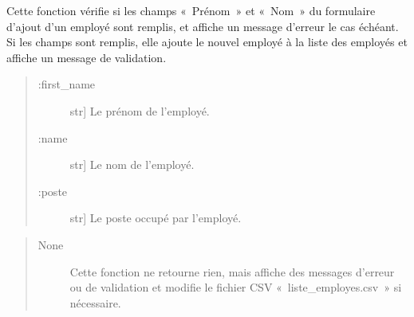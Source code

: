 \documentclass[letterpaper,10pt,french]{sphinxmanual}
\begin{document}
\begin{fulllineitems}
\label{\detokenize{formulaire_comment_xe9:formulaire_commente.check_form}}
\sphinxAtStartPar
Cette fonction vérifie si les champs « Prénom » et « Nom » du formulaire d’ajout d’un employé sont remplis, et affiche un message d’erreur le cas échéant.
Si les champs sont remplis, elle ajoute le nouvel employé à la liste des employés et affiche un message de validation.
\begin{quote}
\begin{description}
\item[{:first\_name}] \leavevmode{[}str{]}
\sphinxAtStartPar
Le prénom de l’employé.

\item[{:name}] \leavevmode{[}str{]}
\sphinxAtStartPar
Le nom de l’employé.

\item[{:poste}] \leavevmode{[}str{]}
\sphinxAtStartPar
Le poste occupé par l’employé.

\end{description}
\end{quote}
\begin{quote}
\begin{description}
\item[{None}] \leavevmode
\sphinxAtStartPar
Cette fonction ne retourne rien, mais affiche des messages d’erreur ou de validation et modifie le fichier CSV « liste\_employes.csv » si nécessaire.

\end{description}
\end{quote}

\begin{sphinxVerbatim}[commandchars=\\\{\}]
  
  
  
\end{sphinxVerbatim}


\end{fulllineitems}
\end{document}
